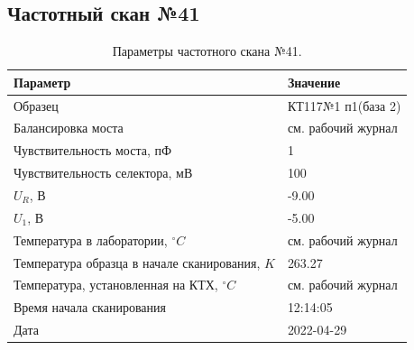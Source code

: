 \subsection{Частотный скан №41}
\begin{table}[!ht]
    \centering
    \caption{Параметры частотного скана №41.}
    \begin{tabular}{|l|l|}
        \hline
        Параметр                                       & Значение                  \\ \hline
        Образец                                        & КТ117№1 п1(база 2)        \\ \hline
        Балансировка моста                             & см. рабочий журнал        \\ \hline
        Чувствительность моста, пФ                     & 1                         \\ \hline
        Чувствительность селектора, мВ                 & 100                       \\ \hline
        $U_R$, В                                       & -9.00                     \\ \hline
        $U_1$, В                                       & -5.00                     \\ \hline
        Температура в лаборатории, $^\circ C$          & см. рабочий журнал        \\ \hline
        Температура образца в начале сканирования, $K$ & 263.27                    \\ \hline
        Температура, установленная на КТХ, $^\circ C$  & см. рабочий журнал        \\ \hline
        Время начала сканирования                      & 12:14:05                  \\ \hline
        Дата                                           & 2022-04-29                \\ \hline
    \end{tabular}
    \label{table:frequency_scan_41}
\end{table}

